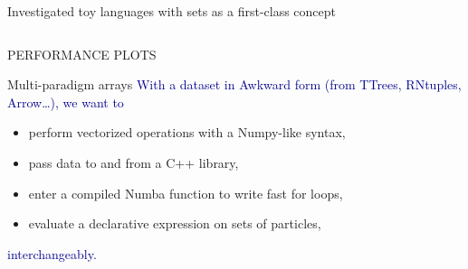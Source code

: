 \documentclass[aspectratio=169]{beamer}
\begin{document}
\begin{frame}[fragile]{Investigated toy languages with sets as a first-class concept}
\begin{columns}
\large
\vspace{-0.45 cm}

\vspace{0.2 cm}
\end{columns}
\end{frame}

\begin{frame}{PERFORMANCE PLOTS}

\end{frame}

\begin{frame}{Multi-paradigm arrays}
\large
\vspace{0.75 cm}
\textcolor{darkblue}{With a dataset in Awkward form (from TTrees, RNtuples, Arrow\ldots), we want to}

\vspace{0.25 cm}
\begin{itemize}\setlength{\itemsep}{0.25 cm}
\item perform vectorized operations with a Numpy-like syntax,
\item pass data to and from a C++ library,
\item enter a compiled Numba function to write fast for loops,
\item evaluate a declarative expression on sets of particles,
\end{itemize}

\vspace{0.25 cm}
\textcolor{darkblue}{interchangeably.}

\vspace{0.5 cm}
\begin{center}
\end{center}
\end{frame}
\end{document}
